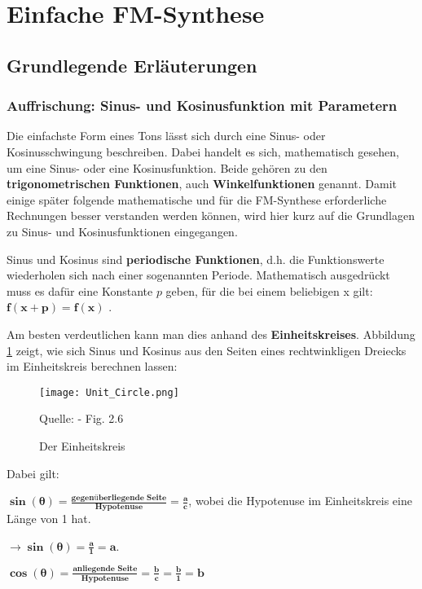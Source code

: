 \section{Einfache FM-Synthese}
\label{einfacheFM}
\FloatBarrier
\subsection{Grundlegende Erläuterungen}
\subsubsection{Auffrischung: Sinus- und Kosinusfunktion mit Parametern}
Die einfachste Form eines Tons lässt sich durch eine Sinus- oder Kosinusschwingung beschreiben. Dabei handelt es sich, mathematisch gesehen, um eine Sinus- oder eine Kosinusfunktion. Beide gehören zu den \textbf{trigonometrischen Funktionen}, auch \textbf{Winkelfunktionen} genannt. Damit einige später folgende mathematische und für die FM-Synthese erforderliche Rechnungen besser verstanden werden können, wird hier kurz auf die Grundlagen zu Sinus- und Kosinusfunktionen eingegangen. 

Sinus und Kosinus sind \textbf{periodische Funktionen}, d.h. die Funktionswerte wiederholen sich nach einer sogenannten Periode. Mathematisch ausgedrückt muss es dafür eine Konstante $p$  geben, für die bei einem beliebigen x gilt: $\bm{f(x + p) =  f(x)}$ .

Am besten verdeutlichen kann man dies anhand des \textbf{Einheitskreises}. Abbildung \ref{fig:unitcircle} zeigt, wie sich Sinus und Kosinus aus den Seiten eines rechtwinkligen Dreiecks im Einheitskreis berechnen lassen:

\begin{figure} [ht]
\centering
\texttt{[image: Unit\_Circle.png]}
\caption{Der Einheitskreis}
\label{fig:unitcircle}
Quelle: \cite{fmtheory} - Fig. 2.6
\end{figure}

Dabei gilt: 

$\bm{\sin(\theta) = \frac{\textbf{gegenüberliegende Seite}}{\textbf{Hypotenuse}} = \frac{a}{c}}$, wobei die Hypotenuse im Einheitskreis eine Länge von 1 hat. 

$\bm{\to\sin(\theta) = \frac{a}{1} = a}$.

$\bm{\cos(\theta) = \frac{\textbf{anliegende Seite}}{\textbf{Hypotenuse}} = \frac{b}{c} = \frac{b}{1} = b}$ \cite[s. 22 - 27]{fmtheory} \\

